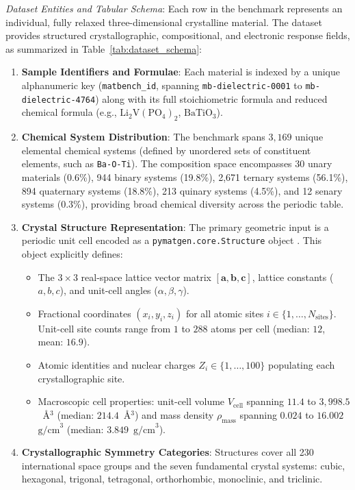 \documentclass[journal,article,submit,moreauthors,pdftex]{article}
\begin{document}
\noindent\textit{Dataset Entities and Tabular Schema}: Each row in the benchmark represents an individual, fully relaxed three-dimensional crystalline material. The dataset provides structured crystallographic, compositional, and electronic response fields, as summarized in Table~\ref{tab:dataset_schema}:
\begin{enumerate}
    \item \textbf{Sample Identifiers and Formulae}: Each material is indexed by a unique alphanumeric key (\texttt{matbench\_id}, spanning \texttt{mb-dielectric-0001} to \texttt{mb-dielectric-4764}) along with its full stoichiometric formula and reduced chemical formula (e.g., $\text{Li}_2\text{V}(\text{PO}_4)_2$, $\text{BaTiO}_3$).
    \item \textbf{Chemical System Distribution}: The benchmark spans $3{,}169$ unique elemental chemical systems (defined by unordered sets of constituent elements, such as \texttt{Ba-O-Ti}). The composition space encompasses 30 unary materials (0.6\%), 944 binary systems (19.8\%), 2,671 ternary systems (56.1\%), 894 quaternary systems (18.8\%), 213 quinary systems (4.5\%), and 12 senary systems (0.3\%), providing broad chemical diversity across the periodic table.
    \item \textbf{Crystal Structure Representation}: The primary geometric input is a periodic unit cell encoded as a \texttt{pymatgen.core.Structure} object \cite{ong2013python}. This object explicitly defines:
    \begin{itemize}
        \item The $3 \times 3$ real-space lattice vector matrix $[\mathbf{a}, \mathbf{b}, \mathbf{c}]$, lattice constants ($a, b, c$), and unit-cell angles ($\alpha, \beta, \gamma$).
        \item Fractional coordinates $(x_i, y_i, z_i)$ for all atomic sites $i \in \{1, \dots, N_{\mathrm{sites}}\}$. Unit-cell site counts range from $1$ to $288$ atoms per cell (median: $12$, mean: $16.9$).
        \item Atomic identities and nuclear charges $Z_i \in \{1, \dots, 100\}$ populating each crystallographic site.
        \item Macroscopic cell properties: unit-cell volume $V_{\mathrm{cell}}$ spanning $11.4$ to $3{,}998.5$~\AA$^3$ (median: $214.4$~\AA$^3$) and mass density $\rho_{\mathrm{mass}}$ spanning $0.024$ to $16.002$~$\text{g/cm}^3$ (median: $3.849$~$\text{g/cm}^3$).
    \end{itemize}
    \item \textbf{Crystallographic Symmetry Categories}: Structures cover all 230 international space groups and the seven fundamental crystal systems: cubic, hexagonal, trigonal, tetragonal, orthorhombic, monoclinic, and triclinic.

\end{enumerate}
\end{document}
